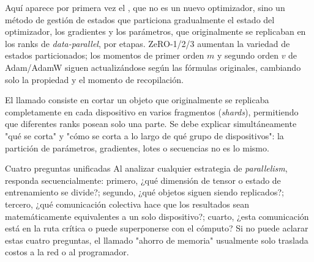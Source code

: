 Aquí aparece por primera vez el , que no es un nuevo optimizador, sino un método de gestión de estados que particiona gradualmente el estado del optimizador, los gradientes y los parámetros, que originalmente se replicaban en los ranks de \textit{data-parallel}, por etapas. ZeRO-1/2/3 aumentan la variedad de estados particionados; los momentos de primer orden $m$ y segundo orden $v$ de Adam/AdamW siguen actualizándose según las fórmulas originales, cambiando solo la propiedad y el momento de recopilación.


El llamado  consiste en cortar un objeto que originalmente se replicaba completamente en cada dispositivo en varios fragmentos (\textit{shards}), permitiendo que diferentes ranks posean solo una parte. Se debe explicar simultáneamente "qué se corta" y "cómo se corta a lo largo de qué grupo de dispositivos": la partición de parámetros, gradientes, lotes o secuencias no es lo mismo.



\begin{importantbox}{Cuatro preguntas unificadas}
Al analizar cualquier estrategia de \textit{parallelism}, responda secuencialmente: primero, ¿qué dimensión de tensor o estado de entrenamiento se divide?; segundo, ¿qué objetos siguen siendo replicados?; tercero, ¿qué comunicación colectiva hace que los resultados sean matemáticamente equivalentes a un solo dispositivo?; cuarto, ¿esta comunicación está en la ruta crítica o puede superponerse con el cómputo? Si no puede aclarar estas cuatro preguntas, el llamado "ahorro de memoria" usualmente solo traslada costos a la red o al programador.
\end{importantbox}

